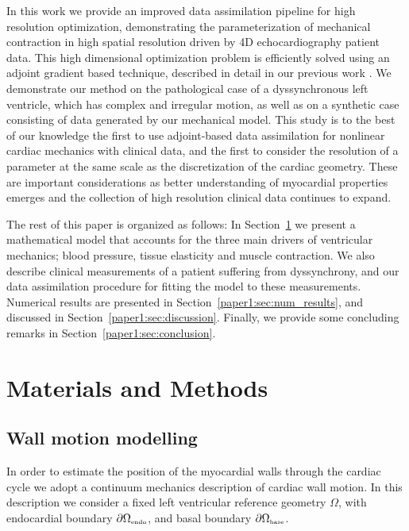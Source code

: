 In this work we provide an improved data assimilation pipeline for high resolution optimization,
demonstrating the parameterization of mechanical contraction in high spatial resolution 
driven by 4D echocardiography patient data. This high dimensional optimization problem 
is efficiently solved using an adjoint gradient based technique, described in detail 
in our previous work \cite{balaban2016adjoint}. We demonstrate our method on the pathological 
case of a dyssynchronous left ventricle, which has complex and irregular motion, 
as well as on a synthetic case consisting of data generated by our mechanical model. 
This study is to the best of our knowledge the first to use adjoint-based data assimilation 
for nonlinear cardiac mechanics with clinical data, and the first to consider the 
resolution of a parameter at the same scale as the discretization of the cardiac geometry.
These are important considerations as better understanding of myocardial properties 
emerges and the collection of high resolution clinical data continues to expand.

The rest of this paper is organized as follows: In
Section~\ref{paper1:sec:methods} we present a mathematical model that
accounts for the three main drivers of ventricular mechanics; blood
pressure, tissue elasticity and muscle contraction.  
We also describe clinical measurements of a patient suffering from dyssynchrony, and our data assimilation procedure
for fitting the model to these measurements.
Numerical results are presented in Section~\ref{paper1:sec:num_results}, and discussed in
Section~\ref{paper1:sec:discussion}. Finally, we provide some concluding
remarks in Section~\ref{paper1:sec:conclusion}.


\section{Materials and Methods}
\label{paper1:sec:methods}

\subsection{Wall motion modelling}

\label{paper1:sec:wall_motion}
In order to estimate the position of the myocardial walls through
the cardiac cycle we adopt a continuum mechanics description of
cardiac wall motion. In this description we consider a fixed left
ventricular reference geometry $\Omega$, with endocardial boundary
$\partial \Omega_{ \textnormal{\tiny \text{endo}}}$, and basal boundary $\partial \Omega_{\textnormal{\tiny\text{base}}}$.


